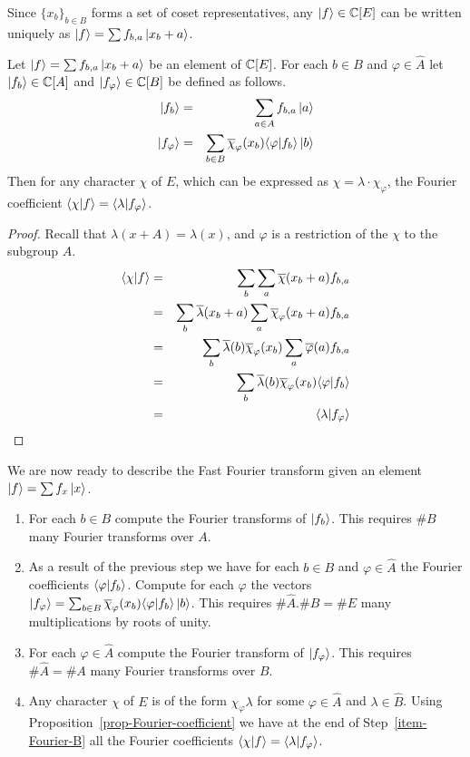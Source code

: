 \documentclass[11pt]{article}
\begin{document}
Since $\{ x_b \}_{b \in B}$ forms a set of coset representatives, any
$\left| f \right\rangle \in \mathbb{C}[E]$ can be written uniquely as $\left| f \right\rangle = \sum f_{b,a}
\left| x_b + a \right\rangle$.

\begin{proposition}\label{prop-Fourier-coefficient}
  Let $\left| f \right\rangle = \sum f_{b,a}\left| x_b + a \right\rangle$ be an element of $\mathbb{C}[E]$.
  For each $b \in B$ and $\varphi \in \hat{A}$ let $\left| f_b \right\rangle\in
  \mathbb{C}[A]$ and $\left| f_\varphi \right\rangle \in \mathbb{C}[B]$ be defined as
  follows.
  \begin{eqnarray*}
    \left| f_b \right\rangle &= & \sum_{a \in A} f_{b,a} \left| a \right\rangle\\
    \left| f_\varphi \right\rangle & = &\sum_{b \in B} \overline{\chi}_{\varphi}(x_b)
    \langle \varphi|f_b \rangle \left| b \right\rangle
  \end{eqnarray*}
  Then for any character $\chi$ of $E$, which can be expressed as
  $\chi = \lambda\cdot\chi_\varphi$, the Fourier coefficient
  $\langle \chi|f \rangle = \langle \lambda|f_\varphi \rangle$.
\end{proposition}
\begin{proof}Recall that $\lambda(x+A) = \lambda(x)$, and $\varphi$ is
  a restriction of the $\chi$ to the subgroup $A$.
\begin{eqnarray*}
\langle \chi|f \rangle & = &
\sum_b\sum_a\overline{\chi}(x_b+a)f_{b,a}\\
& = & \sum_b\overline{\lambda}(x_b+a)\sum_a\overline{\chi}_\varphi(x_b+a)f_{b,a}\\
& = &
\sum_b\overline{\lambda}(b)\overline{\chi}_\varphi(x_b)\sum_a\overline{\varphi}(a)f_{b,a}\\
& = &
\sum_b\overline{\lambda}(b)\overline{\chi}_\varphi(x_b)\langle \varphi|f_b \rangle\\
& = & \langle \lambda|f_\varphi \rangle
\end{eqnarray*}
\end{proof}
We are now ready to describe the Fast Fourier transform given an
element $\left| f \right\rangle = \sum f_x \left| x \right\rangle$.
\begin{enumerate}
\item \label{step_inner_dft} For each $b \in B$ compute the Fourier
  transforms of $\left| f_b \right\rangle$. This requires $\# B$ many Fourier
  transforms over $A$.
\item \label{step_bad_mult}As a result of the previous step we have
  for each $b \in B$ and $\varphi \in \hat{A}$ the Fourier
  coefficients $\langle \varphi|f_b \rangle$. Compute for each $\varphi$ the
  vectors $\left| f_\varphi \right\rangle = \sum_{b \in B}
  \overline{\chi}_{\varphi}(x_b) \langle \varphi|f_b \rangle \left| b \right\rangle$. This
  requires $\# \hat{A} . \# B = \# E$ many multiplications by roots of
  unity.
\item \label{step_outer_dft} For each $\varphi \in \hat{A}$ compute
  the Fourier transform of $\left| f_\varphi \right\rangle$. This requires $\#\hat{A}
  = \# A$ many Fourier transforms over $B$.\label{item-Fourier-B}
\item Any character $\chi$ of $E$ is of the
  form $\chi_\varphi \lambda$ for some $\varphi \in \hat{A}$ and
  $\lambda \in \hat{B}$. Using
  Proposition~\ref{prop-Fourier-coefficient} we have at the end of
  Step~\ref{item-Fourier-B} all the Fourier coefficients
  $\langle \chi|f \rangle = \langle \lambda|f_\varphi \rangle$.
\end{enumerate}
\end{document}
